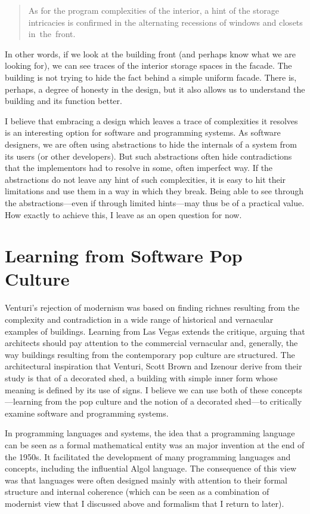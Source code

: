 \begin{quote}
As for the program complexities of the interior, a hint of the storage intricacies is
confirmed in the alternating recessions of windows and closets in~the~front.
\end{quote}

In other words, if we look at the building front (and perhaps know what we are looking for),
we can see traces of the interior storage spaces in the facade. The building is not trying to
hide the fact behind a simple uniform facade. There is, perhaps, a degree of honesty in the
design, but it also allows us to understand the building and its function better.

I believe that embracing a design which leaves a trace of complexities it resolves is an interesting
option for software and programming systems. As software designers, we are often using abstractions
to hide the internals of a system from its users (or other developers). But such abstractions often
hide contradictions that the implementors had to resolve in some, often imperfect way. If the
abstractions do not leave any hint of such complexities, it is easy to hit their limitations and
use them in a way in which they break. Being able to see through the abstractions---even if
through limited hints---may thus be of a practical value.
How exactly to achieve this, I leave as an open question for now.

\section{Learning from Software Pop Culture}

Venturi's rejection of modernism was based on finding richnes resulting from the complexity and
contradiction in a wide range of historical and vernacular examples of buildings. Learning from Las
Vegas extends the critique, arguing that architects should pay attention to the commercial
vernacular and, generally, the way buildings resulting from the contemporary pop culture are
structured. The architectural inspiration that Venturi, Scott Brown and Izenour derive from their
study is that of a decorated shed, a building with simple inner form whose meaning is defined by its
use of signs. I believe we can use both of these concepts---learning from the pop culture and
the notion of a decorated shed---to critically examine software and programming systems.

In programming languages and systems, the idea that a programming language can be seen as a
formal mathematical entity was an major invention at the end of the 1950s. It
facilitated the development of many programming languages and concepts, including the influential
Algol language. The consequence of this view was that languages were often designed mainly
with attention to their formal structure and internal coherence (which can be seen as
a combination of modernist view that I discussed above and formalism that I return to later).


